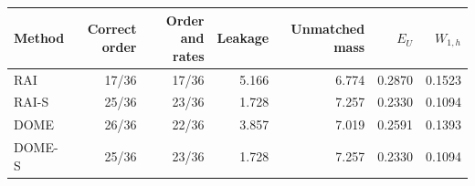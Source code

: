 \begin{tabular}{lrrrrrr}\toprule
Method & Correct order & Order and rates & Leakage & Unmatched mass & $E_U$ & $W_{1,h}$\\\midrule
RAI & 17/36 & 17/36 & 5.166 & 6.774 & 0.2870 & 0.1523 \\
RAI-S & 25/36 & 23/36 & 1.728 & 7.257 & 0.2330 & 0.1094 \\
DOME & 26/36 & 22/36 & 3.857 & 7.019 & 0.2591 & 0.1393 \\
DOME-S & 25/36 & 23/36 & 1.728 & 7.257 & 0.2330 & 0.1094 \\
\bottomrule\end{tabular}
